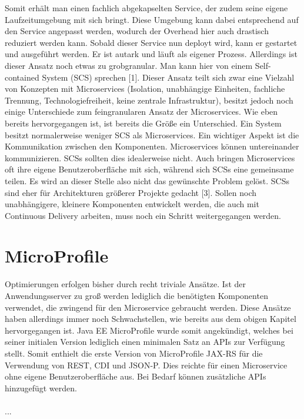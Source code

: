 Somit erhält man einen fachlich abgekapselten Service, der zudem seine eigene Laufzeitumgebung mit sich bringt. Diese Umgebung kann dabei entsprechend auf den Service angepasst werden, wodurch der Overhead hier auch drastisch reduziert werden kann. Sobald dieser Service nun deployt wird, kann er gestartet und ausgeführt werden. Er ist autark und läuft als eigener Prozess. Allerdings ist dieser Ansatz noch etwas zu grobgranular. Man kann hier von einem Self-contained System (SCS) sprechen [1]. Dieser Ansatz teilt sich zwar eine Vielzahl von Konzepten mit Microservices (Isolation, unabhängige Einheiten, fachliche Trennung, Technologiefreiheit, keine zentrale Infrastruktur), besitzt jedoch noch einige Unterschiede zum feingranularen Ansatz der Microservices. Wie eben bereits hervorgegangen ist, ist bereits die Größe ein Unterschied. Ein System besitzt normalerweise weniger SCS als Microservices. Ein wichtiger Aspekt ist die Kommunikation zwischen den Komponenten. Microservices können untereinander kommunizieren. SCSs sollten dies idealerweise nicht. Auch bringen Microservices oft ihre eigene Benutzeroberfläche mit sich, während sich SCSs eine gemeinsame teilen. Es wird an dieser Stelle also nicht das gewünschte Problem gelöst. SCSs sind eher für Architekturen größerer Projekte gedacht [3]. Sollen noch unabhängigere, kleinere Komponenten entwickelt werden, die auch mit Continuous Delivery arbeiten, muss noch ein Schritt weitergegangen werden. 
 
\section{MicroProfile}
Optimierungen erfolgen bisher durch recht triviale Ansätze. Ist der Anwendungsserver zu groß werden lediglich die benötigten Komponenten verwendet, die zwingend für den Microservice gebraucht werden. Diese Ansätze haben allerdings immer noch Schwachstellen, wie bereits aus dem obigen Kapitel hervorgegangen ist. Java EE MicroProfile wurde somit angekündigt, welches bei seiner initialen Version lediglich einen minimalen Satz an APIs zur Verfügung stellt. Somit enthielt die erste Version von MicroProfile JAX-RS für die Verwendung von REST, CDI und JSON-P. Dies reichte für einen Microservice ohne eigene Benutzeroberfläche aus. Bei Bedarf können zusätzliche APIs hinzugefügt werden. \\ \\
...
